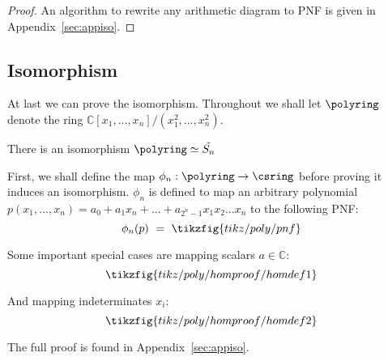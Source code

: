 \begin{proof}
    An algorithm to rewrite any arithmetic diagram to PNF is given in Appendix~\ref*{sec:appiso}.
\end{proof}

\subsection{Isomorphism}

At last we can prove the isomorphism. Throughout we shall let $\polyring$ denote the ring $\mathbb{C}[x_1, ..., x_{n}]/(x_1^2, ..., x_{n}^2)$.


\begin{thm}\label{thm:iso}
    There is an isomorphism $\polyring \simeq \tilde{S_n}$
\end{thm}

First, we shall define the map $\phi_n: \polyring \to \csring$ before proving it induces an isomorphism. $\phi_n$ is defined to map an arbitrary polynomial $p(x_1, ..., x_n) = a_0 + a_1x_n + ... + a_{2^n-1}x_1x_2...x_n$ to the following PNF:
    \begin{equation*}
        \phi_n(p) ~=~ \tikzfig{tikz/poly/pnf}
    \end{equation*}

Some important special cases are mapping scalars $a \in \mathbb{C}$:
 \begin{equation*}
        \tikzfig{tikz/poly/homproof/homdef1}
\end{equation*}

And mapping indeterminates $x_i$:
    \begin{equation*}
        \tikzfig{tikz/poly/homproof/homdef2}
    \end{equation*}

The full proof is found in Appendix~\ref*{sec:appiso}.

